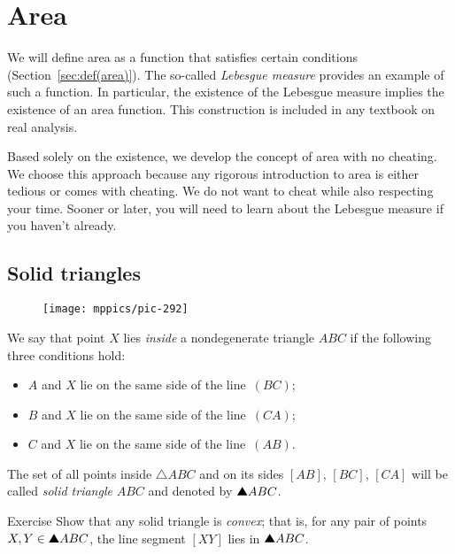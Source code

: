 \chapter{Area}
\label{chap:area}

We will define area as a function that satisfies certain conditions (Section~\ref{sec:def(area)}).
The so-called {}\emph{Lebesgue measure} provides an example of such a function.
In particular, the existence of the Lebesgue measure implies the existence of an area function.
This construction is included in any textbook on real analysis.

Based solely on the existence, we develop the concept of area with no cheating.
We choose this approach because any rigorous introduction to area is either tedious or comes with cheating.
We do not want to cheat while also respecting your time. 
Sooner or later, you will need to learn about the Lebesgue measure if you haven't already.


\section{Solid triangles}

{

\begin{wrapfigure}{r}{27 mm}
\vskip-8mm
\centering
\texttt{[image: mppics/pic-292]}
\end{wrapfigure}

We say that point $X$ lies \emph{inside} a nondegenerate triangle $ABC$ if the following three conditions hold:

\begin{itemize}
\item $A$ and $X$ lie on the same side of the line~$(BC)$;
\item $B$ and $X$ lie on the same side of the line~$(CA)$;
\item $C$ and $X$ lie on the same side of the line~$(AB)$.
\end{itemize}

}

The set of all points inside $\triangle ABC$ 
and on its sides $[AB]$, $[BC]$, $[CA]$
will be called \emph{solid triangle} $ABC$ and denoted by $\solidtriangle ABC$.

\begin{thm}{Exercise}\label{ex:triangle-convex}
Show that any solid triangle is \emph{convex};
that is, for any pair of points $X,Y\z\in\solidtriangle ABC$,
the line segment $[XY]$ lies in  $\solidtriangle ABC$.
\end{thm}



